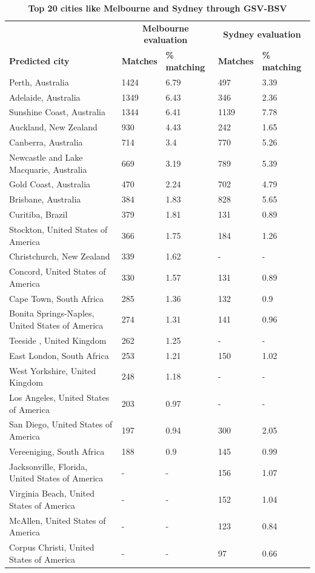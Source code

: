 \documentclass[10pt,letterpaper]{article}
\begin{document}
\begin{table}[!htbp]
\begin{adjustwidth}{-2.25in}{0in}
\caption{\bf Top 20 cities like Melbourne and Sydney through GSV-BSV \label{tab:melbournesydneyGSV}}     
\begin{tabular}{ l  l l l  l}
 \hline    &  \multicolumn{2}{c}{\textbf{Melbourne evaluation}} & \multicolumn{2}{c}{\textbf{Sydney evaluation}}  \\  
\textbf{Predicted city} & \textbf{Matches} & \textbf{\% matching}  & \textbf{Matches} & \textbf{\% matching}\\ \hline
Perth, Australia & 1424 & 6.79 & 497 & 3.39 \\ 
Adelaide, Australia & 1349 & 6.43 & 346 & 2.36 \\ 
Sunshine Coast, Australia & 1344 & 6.41 & 1139 & 7.78 \\ 
Auckland, New Zealand & 930 & 4.43 & 242 & 1.65 \\ 
Canberra, Australia & 714 & 3.4 & 770 & 5.26 \\ 
Newcastle and Lake Macquarie, Australia & 669 & 3.19 & 789 & 5.39 \\ 
Gold Coast, Australia & 470 & 2.24 & 702 & 4.79 \\ 
Brisbane, Australia & 384 & 1.83 & 828 & 5.65 \\ 
Curitiba, Brazil & 379 & 1.81 & 131 & 0.89 \\ 
Stockton, United States of America & 366 & 1.75 & 184 & 1.26 \\ 
Christchurch, New Zealand & 339 & 1.62 &-&- \\ 
Concord, United States of America & 330 & 1.57 & 131 & 0.89 \\ 
Cape Town, South Africa & 285 & 1.36 & 132 & 0.9 \\ 
Bonita Springs-Naples, United States of America & 274 & 1.31 & 141 & 0.96 \\ 
Teeside , United Kingdom & 262 & 1.25 &-&- \\ 
East London, South Africa & 253 & 1.21 & 150 & 1.02 \\ 
West Yorkshire, United Kingdom & 248 & 1.18 &-&- \\ 
Los Angeles, United States of America & 203 & 0.97 &-&- \\ 
San Diego, United States of America & 197 & 0.94 & 300 & 2.05 \\ 
Vereeniging, South Africa & 188 & 0.9 & 145 & 0.99 \\ 
Jacksonville, Florida, United States of America  &-&- & 156 & 1.07\\ 
Virginia Beach, United States of America  &-&- & 152 & 1.04\\ 
McAllen, United States of America&-&- & 123 & 0.84\\ 
Corpus Christi, United States of America&-&- & 97 & 0.66\\ \hline
\end{tabular}
\end{adjustwidth}
\end{table}
\end{document}
